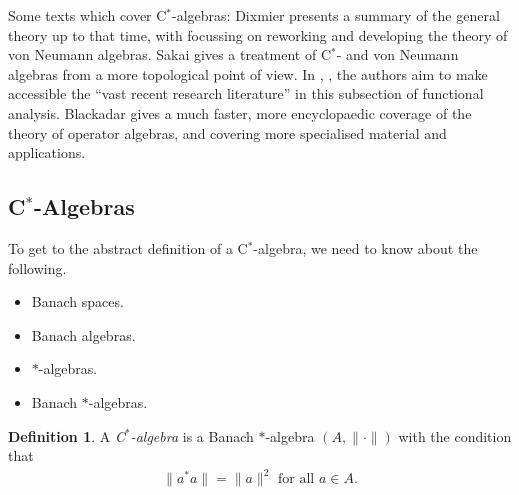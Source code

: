 \documentclass[12pt,a4paper]{amsart}
\theoremstyle{plain}
\theoremstyle{definition}
\newtheorem{defn}{Definition}
\begin{document}
	Some texts which cover C$^\ast$-algebras: 
	Dixmier \cite{dixmier77} presents a summary of the general theory up to that time, with \cite{dixmier81} focussing on reworking and developing the theory of von Neumann algebras. 
	Sakai \cite{sakai71} gives a treatment of C$^\ast$- and von Neumann algebras from a more topological point of view.
	In \cite{kadison83}, \cite{kadison86}, the authors aim to make accessible the ``vast recent research literature'' in this subsection of functional analysis.
	Blackadar \cite{blackadar06} gives a much faster, more encyclopaedic coverage of the theory of operator algebras, and covering more specialised material and applications.
	

	
\subsection{C$^\ast$-Algebras}
	To get to the abstract definition of a C$^\ast$-algebra, we need to know about the following.
\begin{itemize}
	\item Banach spaces.
	\item Banach algebras.
	\item $\ast$-algebras.
	\item Banach $\ast$-algebras.
\end{itemize}
\iffalse
A Banach space is a complete normed linear space. 
A Banach algebra is a Banach space A which forms an algebra, such that 
\begin{align*}
	\|ab\| \leq \|a\| \|b\| \mbox{ for all } a,b \in A.
\end{align*}
A $\ast$-algebra is an algebra A with an \emph{involution} $\ast : A \to A $ such that, for all $a,b \in A$,
\begin{align*}
	 a^{\ast\ast} = (a^\ast)^\ast = a,\\
	(a+b)^\ast = a^\ast + b^\ast,\\	
	(ab)^\ast = b^\ast a^\ast.
\end{align*}
A Banach $\ast$-algebra is a Banach algebra which is also a $\ast$-algebra such that 
\fi

\begin{defn}
A \emph{C$^\ast$-algebra} is a Banach $\ast$-algebra $(A, \| \cdot \|)$ with the condition that
\begin{align*}
	\|a ^\ast a\| = \|a\|^2 \mbox{ for all } a \in A.
\end{align*}
\end{defn}
 
\end{document}
